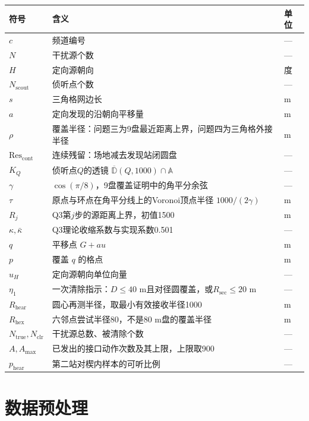 \documentclass{cumcmthesis}
\begin{document}
\begin{center}
\begin{tabular}{@{}>{\raggedright\arraybackslash}p{}>{\raggedright\arraybackslash}p{}p{}@{}}
\toprule
符号 & 含义 & 单位 \\
\midrule
$c$ & 频道编号 & --- \\
$N$ & 干扰源个数 & --- \\
$H$ & 定向源朝向 & 度 \\
$N_{\mathrm{scout}}$ & 侦听点个数 & --- \\
$s$ & 三角格网边长 & m \\
$a$ & 定向发现的沿朝向平移量 & m \\
$\rho$ & 覆盖半径：问题三为9盘最近距离上界，问题四为三角格外接半径 & m \\
$\mathrm{Res}_{\mathrm{cont}}$ & 连续残留：场地减去发现站闭圆盘 & --- \\
$K_Q$ & 侦听点$Q$的透镜 $\overline{\mathbb{D}}(Q,1000)\cap\mathbb{A}$ & --- \\
$\gamma$ & $\cos(\pi/8)$，9盘覆盖证明中的角平分余弦 & --- \\
$\tau$ & 原点与环点在角平分线上的Voronoi顶点半径 $1000/(2\gamma)$ & m \\
$R_j$ & Q3第$j$步的源距离上界，初值1500 & m \\
$\kappa,\bar\kappa$ & Q3理论收缩系数与实现系数0.501 & --- \\
$q$ & 平移点 $G+au$ & m \\
$p$ & 覆盖 $q$ 的格点 & m \\
$u_H$ & 定向源朝向单位向量 & --- \\
$\eta_1$ & 一次清除指示：$D\le 40$ m且对径圆覆盖，或$R_{\mathrm{sec}}\le 20$ m & --- \\
$R_{\mathrm{hear}}$ & 圆心再测半径，取最小有效接收半径1000 & m \\
$R_{\mathrm{hex}}$ & 六邻点尝试半径80，不是80 m盘的覆盖半径 & m \\
$N_{\mathrm{true}},N_{\mathrm{clr}}$ & 干扰源总数、被清除个数 & --- \\
$A,A_{\max}$ & 已发出的接口动作次数及其上限，上限取900 & --- \\
$p_{\mathrm{hear}}$ & 第二站对楔内样本的可听比例 & --- \\
\bottomrule
\end{tabular}
\end{center}

\section{数据预处理}
\end{document}
